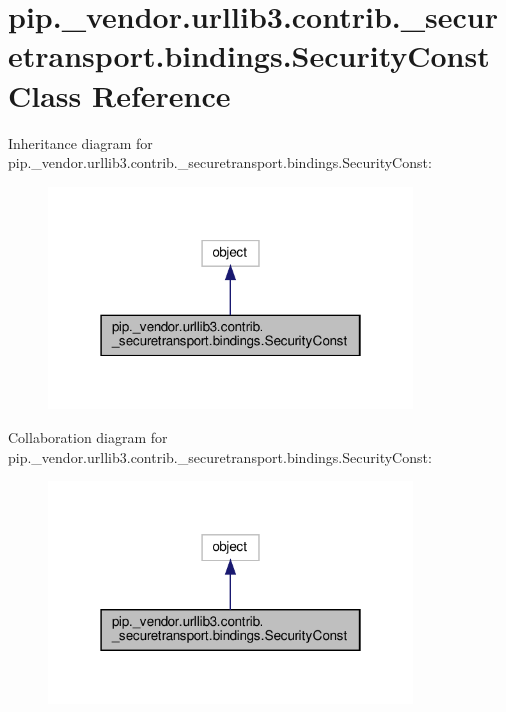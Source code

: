 \hypertarget{classpip_1_1__vendor_1_1urllib3_1_1contrib_1_1__securetransport_1_1bindings_1_1SecurityConst}{}\section{pip.\+\_\+vendor.\+urllib3.\+contrib.\+\_\+securetransport.\+bindings.\+Security\+Const Class Reference}
\label{classpip_1_1__vendor_1_1urllib3_1_1contrib_1_1__securetransport_1_1bindings_1_1SecurityConst}


Inheritance diagram for pip.\+\_\+vendor.\+urllib3.\+contrib.\+\_\+securetransport.\+bindings.\+Security\+Const\+:
\nopagebreak
\begin{figure}[H]
\begin{center}
\leavevmode
\includegraphics[width=274pt]{classpip_1_1__vendor_1_1urllib3_1_1contrib_1_1__securetransport_1_1bindings_1_1SecurityConst__inherit__graph}
\end{center}
\end{figure}


Collaboration diagram for pip.\+\_\+vendor.\+urllib3.\+contrib.\+\_\+securetransport.\+bindings.\+Security\+Const\+:
\nopagebreak
\begin{figure}[H]
\begin{center}
\leavevmode
\includegraphics[width=274pt]{classpip_1_1__vendor_1_1urllib3_1_1contrib_1_1__securetransport_1_1bindings_1_1SecurityConst__coll__graph}
\end{center}
\end{figure}
